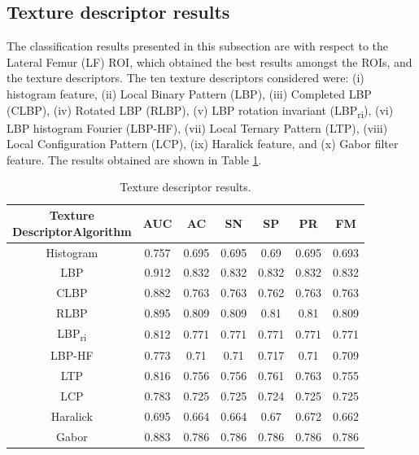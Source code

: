 \documentclass[review]{elsarticle}
\begin{document}
\subsection{Texture descriptor results}

The classification results presented in this subsection are with respect to the Lateral Femur (LF) ROI, which obtained the best results amongst the ROIs, and the texture descriptors. The ten texture descriptors considered were: (i) histogram feature, (ii) Local Binary Pattern (LBP), (iii) Completed LBP (CLBP), (iv) Rotated LBP (RLBP), (v) LBP rotation invariant (LBP\textsubscript{ri}), (vi) LBP histogram Fourier (LBP-HF), (vii) Local Ternary Pattern (LTP), (viii) Local Configuration Pattern (LCP), (ix) Haralick feature, and (x) Gabor filter feature. The results obtained are shown in Table \ref{tab:TextureResult}. \\

\begin{table}[h!]
	\centering
	\begin{tabular}{|c|c|c|c|c|c|c|}
		\hline 
		\backslashbox{Texture \\ Descriptor}{Algorithm} &AUC&AC&SN&SP&PR&FM\\
		\hline 
		Histogram	& 0.757 & 0.695  & 0.695 & 0.69  & 0.695  & 0.693 \\ 
		\hline
		\cellcolor{blue!25}	LBP 		&\cellcolor{blue!25}0.912  &\cellcolor{blue!25}0.832  &\cellcolor{blue!25}0.832  &\cellcolor{blue!25}0.832  &\cellcolor{blue!25}0.832  &\cellcolor{blue!25}0.832  \\
		\hline
		CLBP		& 0.882 & 0.763 & 0.763 & 0.762  & 0.763  & 0.763  \\ 
		\hline
		RLBP	 	& 0.895  & 0.809  & 0.809  & 0.81  & 0.81  & 0.809  \\
		\hline
		LBP\textsubscript{ri}	& 0.812  & 0.771  & 0.771  & 0.771  & 0.771  & 0.771  \\
		\hline
		LBP-HF 		& 0.773  & 0.71  & 0.71  & 0.717  & 0.71  & 0.709  \\ 
		\hline
		LTP		 	& 0.816  & 0.756  & 0.756  & 0.761  & 0.763  & 0.755  \\
		\hline
		LCP		 	& 0.783  & 0.725  & 0.725  & 0.724  & 0.725  & 0.725  \\
		\hline
		Haralick 	& 0.695  & 0.664  & 0.664  & 0.67  & 0.672  & 0.662  \\
		\hline
		Gabor		& 0.883  & 0.786  & 0.786  & 0.786  & 0.786  & 0.786  \\ 
		\hline
	\end{tabular} 
	\caption{Texture descriptor results.}
	\label{tab:TextureResult}
\end{table}
\end{document}
